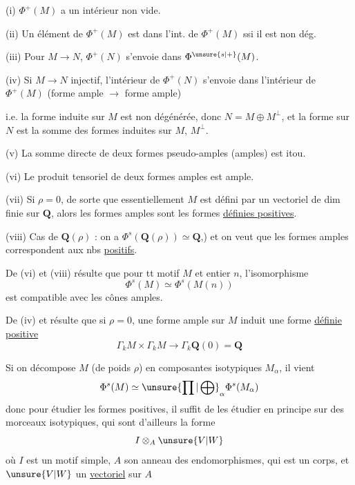 (i) $\Phi^+(M)$ a un intérieur non vide.

(ii) Un élément de $\Phi^+(M)$ est dans l'int. de $\Phi^+(M)$ ssi il est non dég.


(iii) Pour $M\longrightarrow N$, $\Phi^+(N)$ s'envoie dans $\Phi^{\unsure{s|+}}(M)$.

(iv)  Si $M\longrightarrow N$ injectif,
 l'intérieur
de $\Phi^+(N)$ s'envoie dans l'intérieur
de $\Phi^+(M)$ (forme ample $\longrightarrow$ forme ample)

i.e. la forme induite sur $M$ 
est non dégénérée,
donc $N=M\oplus M^\perp$, et la forme sur
$N$ est la somme des formes induites sur
$M$, $M^\perp$.

(v) La somme directe de deux formes
 pseudo-amples (amples) est
itou.

(vi) Le produit tensoriel de deux formes
amples est ample.

(vii) Si $\rho=0$, de sorte que essentiellement $M$
est défini par un vectoriel de dim
finie sur $\mathbf Q$, alors les formes amples
sont les formes \uline{définies positives}.

(viii) Cas de $\mathbf Q(\rho)$ : on a $\Phi^s(\mathbf Q(\rho))\simeq\mathbf Q$,)
et on veut que les formes amples
correspondent aux nbs  \uline{positifs}.

De (vi) et (viii) résulte que pour tt
motif $M$ et entier $n$, l'isomorphisme
\[
\Phi^s(M)\simeq\Phi^s(M(n))
\]
est compatible avec les cônes amples.

De (iv) et  résulte que si $\rho=0$, une
forme ample sur $M$ induit une
forme \uline{définie positive}
\[
\Gamma_k M\times\Gamma_k M\longrightarrow\Gamma_k\mathbf Q(0)=\mathbf Q
\]

Si on décompose $M$ (de poids $\rho$) en
composantes isotypiques $M_\alpha$, il vient
\[
\Phi^s(M)\simeq\unsure{\prod|\bigoplus}_\alpha\Phi^s(M_\alpha)
\]
donc pour étudier les formes positives, il
suffit de les étudier en principe sur
des morceaux isotypiques, qui sont
d'ailleurs  la forme
\[
I\otimes_A\unsure{V|W}
\]
où $I$ est un motif simple, $A$ son
anneau des endomorphismes, qui est
un corps, et $\unsure{V|W}$ un \uline{vectoriel} sur $A$

